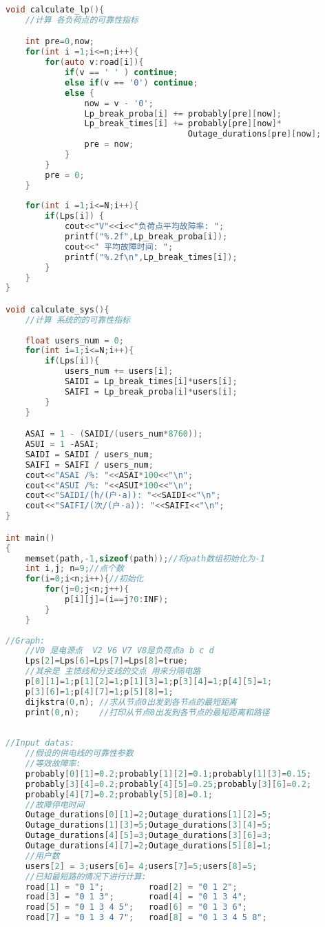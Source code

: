 \documentclass[withoutpreface,bwprint]{cumcmthesis} %
\begin{document}
\begin{appendices}
\begin{lstlisting}[language=C]
void calculate_lp(){
    //计算 各负荷点的可靠性指标

    int pre=0,now;
    for(int i =1;i<=n;i++){
        for(auto v:road[i]){
            if(v == ' ' ) continue;
            else if(v == '0') continue;
            else {
                now = v - '0';
                Lp_break_proba[i] += probably[pre][now];
                Lp_break_times[i] += probably[pre][now]*
                                     Outage_durations[pre][now];
                pre = now;
            }
        }
        pre = 0;
    }
    
    for(int i =1;i<=N;i++){
        if(Lps[i]) {
            cout<<"V"<<i<<"负荷点平均故障率: ";
            printf("%.2f",Lp_break_proba[i]);
            cout<<" 平均故障时间: ";
            printf("%.2f\n",Lp_break_times[i]);
        }
    }
}

void calculate_sys(){
    //计算 系统的的可靠性指标
    
    float users_num = 0;
    for(int i=1;i<=N;i++){
        if(Lps[i]){
            users_num += users[i];
            SAIDI = Lp_break_times[i]*users[i];
            SAIFI = Lp_break_proba[i]*users[i];
        }
    }

    ASAI = 1 - (SAIDI/(users_num*8760));
    ASUI = 1 -ASAI;
    SAIDI = SAIDI / users_num;
    SAIFI = SAIFI / users_num;
    cout<<"ASAI /%: "<<ASAI*100<<"\n";
    cout<<"ASUI /%: "<<ASUI*100<<"\n";
    cout<<"SAIDI/(h/(户·a)): "<<SAIDI<<"\n";
    cout<<"SAIFI/(次/(户·a)): "<<SAIFI<<"\n";
}

int main()
{
    memset(path,-1,sizeof(path));//将path数组初始化为-1
    int i,j; n=9;//点个数
    for(i=0;i<n;i++){//初始化
        for(j=0;j<n;j++){
            p[i][j]=(i==j?0:INF);
        }
    }
    
//Graph:
    //V0 是电源点  V2 V6 V7 V8是负荷点a b c d  
    Lps[2]=Lps[6]=Lps[7]=Lps[8]=true;
    //其余是 主馈线和分支线的交点 用来分隔电路
    p[0][1]=1;p[1][2]=1;p[1][3]=1;p[3][4]=1;p[4][5]=1;
    p[3][6]=1;p[4][7]=1;p[5][8]=1;
    dijkstra(0,n); //求从节点0出发到各节点的最短距离
    print(0,n);    //打印从节点0出发到各节点的最短距离和路径
   
    
//Input datas:
    //假设的供电线的可靠性参数
    //等效故障率:
    probably[0][1]=0.2;probably[1][2]=0.1;probably[1][3]=0.15;
    probably[3][4]=0.2;probably[4][5]=0.25;probably[3][6]=0.2;
    probably[4][7]=0.2;probably[5][8]=0.1;
    //故障停电时间
    Outage_durations[0][1]=2;Outage_durations[1][2]=5;
    Outage_durations[1][3]=5;Outage_durations[3][4]=5;
    Outage_durations[4][5]=3;Outage_durations[3][6]=3;
    Outage_durations[4][7]=2;Outage_durations[5][8]=1;
    //用户数
    users[2] = 3;users[6]= 4;users[7]=5;users[8]=5;
    //已知最短路的情况下进行计算:
    road[1] = "0 1";         road[2] = "0 1 2";
    road[3] = "0 1 3";       road[4] = "0 1 3 4";
    road[5] = "0 1 3 4 5";   road[6] = "0 1 3 6";
    road[7] = "0 1 3 4 7";   road[8] = "0 1 3 4 5 8";



\end{lstlisting}
\end{appendices}
\end{document}
